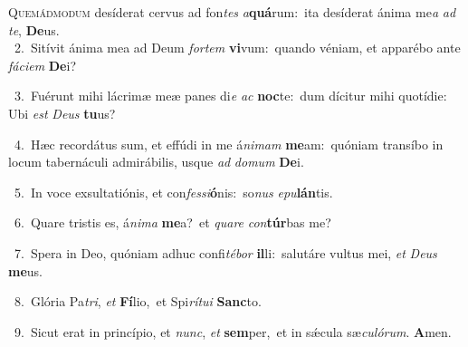 \lettrine{\initial\textcolor{\initialcolor}{Q}}{uemádmodum} desíderat cervus ad fon\textit{tes} \textit{a}\-\textbf{quá}rum:~\star ita desíderat ánima me\textit{a} \textit{ad} \textit{te}\-, \textbf{De}\-us.\\
{\numbfont\textcolor{\numbcolor}{~2.}}~Sitívit ánima mea ad Deum \textit{for}\-\textit{tem} \textbf{vi}\-vum:~\star quando véniam, et apparébo ante \textit{fá}\-\textit{ci}\textit{em} \textbf{De}\-i?\par
{\numbfont\textcolor{\numbcolor}{~3.}}~Fuérunt mihi lácrimæ meæ panes di\textit{e} \textit{ac} \textbf{noc}\-te:~\star dum dícitur mihi quotídie: Ubi \textit{est} \textit{De}\-\textit{us} \textbf{tu}\-us?\par
{\numbfont\textcolor{\numbcolor}{~4.}}~Hæc recordátus sum, et effúdi in me á\-\textit{ni}\-\textit{mam} \textbf{me}\-am:~\star quóniam transíbo in locum tabernáculi admirábilis, usque \textit{ad} \textit{do}\-\textit{mum} \textbf{De}\-i.\par
{\numbfont\textcolor{\numbcolor}{~5.}}~In voce exsultatiónis, et con\-\textit{fes}\-\textit{si}\textbf{ó}nis:~\star so\textit{nus} \textit{e}\-\textit{pu}\textbf{lán}tis.\par
{\numbfont\textcolor{\numbcolor}{~6.}}~Quare tristis es, á\-\textit{ni}\-\textit{ma} \textbf{me}\-a?~\star et \textit{qua}\-\textit{re} \textit{con}\-\textbf{túr}bas me?\par
{\numbfont\textcolor{\numbcolor}{~7.}}~Spera in Deo, quóniam adhuc confi\-\textit{té}\-\textit{bor} \textbf{il}\-li:~\star salutáre vultus mei, \textit{et} \textit{De}\-\textit{us} \textbf{me}\-us.\par
{\numbfont\textcolor{\numbcolor}{~8.}}~Glória Pa\-\textit{tri}\-, \textit{et} \textbf{Fí}\-lio,~\star et Spi\-\textit{rí}\-\textit{tu}\textit{i} \textbf{Sanc}\-to.\par
{\numbfont\textcolor{\numbcolor}{~9.}}~Sicut erat in princípio, et \textit{nunc}\-, \textit{et} \textbf{sem}\-per,~\star et in sǽcula sæ\-\textit{cu}\-\textit{ló}\textit{rum}. \textbf{A}\-men.\par
